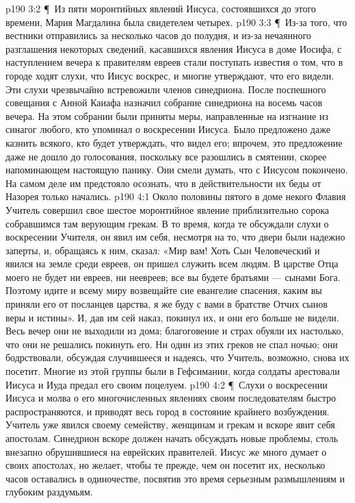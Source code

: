 \vs p190 3:2 \P\ Из пяти моронтийных явлений Иисуса, состоявшихся до этого времени, Мария Магдалина была свидетелем четырех.
\vs p190 3:3 \P\ Из\hyp{}за того, что вестники отправились за несколько часов до полудня, и из\hyp{}за нечаянного разглашения некоторых сведений, касавшихся явления Иисуса в доме Иосифа, с наступлением вечера к правителям евреев стали поступать известия о том, что в городе ходят слухи, что Иисус воскрес, и многие утверждают, что его видели. Эти слухи чрезвычайно встревожили членов синедриона. После поспешного совещания с Анной Каиафа назначил собрание синедриона на восемь часов вечера. На этом собрании были приняты меры, направленные на изгнание из синагог любого, кто упоминал о воскресении Иисуса. Было предложено даже казнить всякого, кто будет утверждать, что видел его; впрочем, это предложение даже не дошло до голосования, поскольку все разошлись в смятении, скорее напоминающем настоящую панику. Они смели думать, что с Иисусом покончено. На самом деле им предстояло осознать, что в действительности их беды от Назорея только начались.
\vs p190 4:1 Около половины пятого в доме некого Флавия Учитель совершил свое шестое моронтийное явление приблизительно сорока собравшимся там верующим грекам. В то время, когда те обсуждали слухи о воскресении Учителя, он явил им себя, несмотря на то, что двери были надежно заперты, и, обращаясь к ним, сказал: «Мир вам! Хоть Сын Человеческий и явился на земле среди евреев, он пришел служить всем людям. В царстве Отца моего не будет ни евреев, ни неевреев; все вы будете братьями --- сынами Бога. Поэтому идите и всему миру возвещайте сие евангелие спасения, каким вы приняли его от посланцев царства, я же буду с вами в братстве Отчих сынов веры и истины». И, дав им сей наказ, покинул их, и они его больше не видели. Весь вечер они не выходили из дома; благоговение и страх обуяли их настолько, что они не решались покинуть его. Ни один из этих греков не спал ночью; они бодрствовали, обсуждая случившееся и надеясь, что Учитель, возможно, снова их посетит. Многие из этой группы были в Гефсимании, когда солдаты арестовали Иисуса и Иуда предал его своим поцелуем.
\vs p190 4:2 \P\ Слухи о воскресении Иисуса и молва о его многочисленных явлениях своим последователям быстро распространяются, и приводят весь город в состояние крайнего возбуждения. Учитель уже явился своему семейству, женщинам и грекам и вскоре явит себя апостолам. Синедрион вскоре должен начать обсуждать новые проблемы, столь внезапно обрушившиеся на еврейских правителей. Иисус же много думает о своих апостолах, но желает, чтобы те прежде, чем он посетит их, несколько часов оставались в одиночестве, посвятив это время серьезным размышлениям и глубоким раздумьям.
